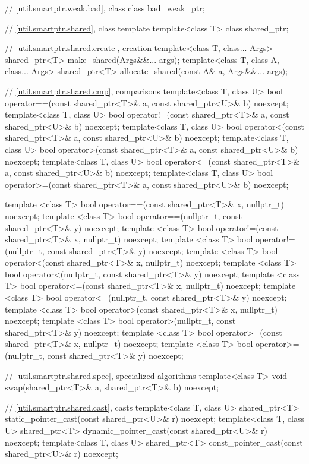 \begin{codeblock}
{  // \ref{util.smartptr.weak.bad}, class 
  class bad_weak_ptr;

  // \ref{util.smartptr.shared}, class template 
  template<class T> class shared_ptr;

  // \ref{util.smartptr.shared.create},  creation
  template<class T, class... Args>
    shared_ptr<T> make_shared(Args&&... args);
  template<class T, class A, class... Args>
    shared_ptr<T> allocate_shared(const A& a, Args&&... args);

  // \ref{util.smartptr.shared.cmp},  comparisons
  template<class T, class U>
    bool operator==(const shared_ptr<T>& a, const shared_ptr<U>& b) noexcept;
  template<class T, class U>
    bool operator!=(const shared_ptr<T>& a, const shared_ptr<U>& b) noexcept;
  template<class T, class U>
    bool operator<(const shared_ptr<T>& a, const shared_ptr<U>& b) noexcept;
  template<class T, class U>
    bool operator>(const shared_ptr<T>& a, const shared_ptr<U>& b) noexcept;
  template<class T, class U>
    bool operator<=(const shared_ptr<T>& a, const shared_ptr<U>& b) noexcept;
  template<class T, class U>
    bool operator>=(const shared_ptr<T>& a, const shared_ptr<U>& b) noexcept;

  template <class T>
    bool operator==(const shared_ptr<T>& x, nullptr_t) noexcept;
  template <class T>
    bool operator==(nullptr_t, const shared_ptr<T>& y) noexcept;
  template <class T>
    bool operator!=(const shared_ptr<T>& x, nullptr_t) noexcept;
  template <class T>
    bool operator!=(nullptr_t, const shared_ptr<T>& y) noexcept;
  template <class T>
    bool operator<(const shared_ptr<T>& x, nullptr_t) noexcept;
  template <class T>
    bool operator<(nullptr_t, const shared_ptr<T>& y) noexcept;
  template <class T>
    bool operator<=(const shared_ptr<T>& x, nullptr_t) noexcept;
  template <class T>
    bool operator<=(nullptr_t, const shared_ptr<T>& y) noexcept;
  template <class T>
    bool operator>(const shared_ptr<T>& x, nullptr_t) noexcept;
  template <class T>
    bool operator>(nullptr_t, const shared_ptr<T>& y) noexcept;
  template <class T>
    bool operator>=(const shared_ptr<T>& x, nullptr_t) noexcept;
  template <class T>
    bool operator>=(nullptr_t, const shared_ptr<T>& y) noexcept;

  // \ref{util.smartptr.shared.spec},  specialized algorithms
  template<class T>
    void swap(shared_ptr<T>& a, shared_ptr<T>& b) noexcept;

  // \ref{util.smartptr.shared.cast},  casts
  template<class T, class U>
    shared_ptr<T> static_pointer_cast(const shared_ptr<U>& r) noexcept;
  template<class T, class U>
    shared_ptr<T> dynamic_pointer_cast(const shared_ptr<U>& r) noexcept;
  template<class T, class U>
    shared_ptr<T> const_pointer_cast(const shared_ptr<U>& r) noexcept;

}
\end{codeblock}
